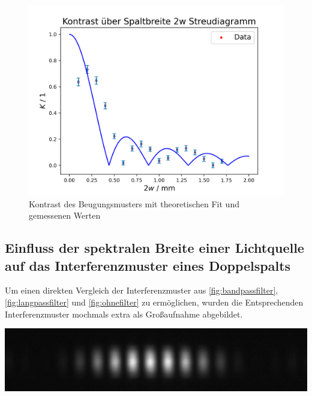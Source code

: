 \documentclass[11pt,ngerman]{scrartcl}
\begin{document}
\begin{figure}[H]
	\begin{center}
		\begin{minipage}[t]{0.7\textwidth}
			\includegraphics[width=\textwidth]{auswertung/kontrast}
		\end{minipage}
	\end{center}
	\caption{Kontrast des Beugungsmusters mit theoretischen Fit und gemessenen Werten}
	\label{fig:kontrast}
\end{figure}





\subsection{Einfluss der spektralen Breite einer Lichtquelle auf das Interferenzmuster eines Doppelspalts}

Um einen direkten Vergleich der Interferenzmuster aus \autoref{fig:bandpassfilter}, \autoref{fig:langpassfilter} und \autoref{fig:ohnefilter} zu ermöglichen, wurden die Entsprechenden Interferenzmuster mochmals extra als Großaufnahme abgebildet.

\begin{center}
	\begin{minipage}[t]{\textwidth}
		\includegraphics[width=\textwidth]{Interfero/Versuch2/bandpassfilter_m}
		\label{fig:bandpassfilter_m}
	\end{minipage}
\end{center}
\end{document}
